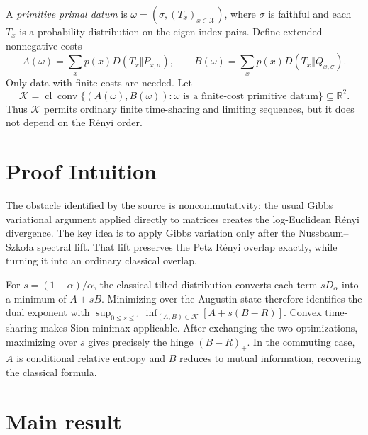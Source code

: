 \documentclass[10pt]{article}
\newcommand{\conv}{\operatorname{conv}}
\newcommand{\cl}{\operatorname{cl}}
\newcommand{\cK}{\mathcal K}
\begin{document}
A \emph{primitive primal datum} is
$\omega=(\sigma,(T_x)_{x\in\mathcal X})$, where $\sigma$ is faithful and
each $T_x$ is a probability distribution on the eigen-index pairs. Define
extended nonnegative costs
\begin{equation}\label{eq:AB}
 A(\omega)=\sum_xp(x)D(T_x\Vert P_{x,\sigma}),
 \qquad
 B(\omega)=\sum_xp(x)D(T_x\Vert Q_{x,\sigma}).
\end{equation}
Only data with finite costs are needed. Let
\begin{equation}\label{eq:K}
 \cK=\cl\conv\bigl\{(A(\omega),B(\omega)):\omega
 \text{ is a finite-cost primitive datum}\bigr\}\subseteq\mathbb R^2.
\end{equation}
Thus $\cK$ permits ordinary finite time-sharing and limiting sequences, but it
does not depend on the R\'enyi order.

\section{\hspace{0.22em}Proof Intuition}

The obstacle identified by the source is noncommutativity: the usual Gibbs
variational argument applied directly to matrices creates the log-Euclidean
R\'enyi divergence. The key idea is to apply Gibbs variation only after the
Nussbaum--Szko\l a spectral lift. That lift preserves the Petz R\'enyi overlap
exactly, while turning it into an ordinary classical overlap.

For $s=(1-\alpha)/\alpha$, the classical tilted distribution converts each
term $sD_\alpha$ into a minimum of $A+sB$. Minimizing over the Augustin state
therefore identifies the dual exponent with
$\sup_{0\le s\le1}\inf_{(A,B)\in\cK}[A+s(B-R)]$. Convex time-sharing makes
Sion minimax applicable. After exchanging the two optimizations, maximizing
over $s$ gives precisely the hinge $(B-R)_+$. In the commuting case, $A$ is
conditional relative entropy and $B$ reduces to mutual information, recovering
the classical formula.

\section{\hspace{0.22em}Main result}
\end{document}
